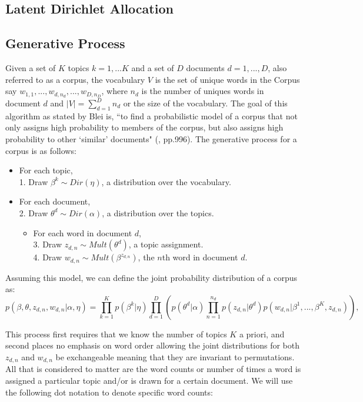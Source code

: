\documentclass[12pt]{report}
\begin{document}
\begin{flushleft}
\section{Latent Dirichlet Allocation}
\subsection{Generative Process}
Given a set of $K$ topics $k=1,...K$ and a set of $D$ documents $d=1,...,D$, also referred to as a corpus, the vocabulary $V$ is the set of unique words in the Corpus say $w_{1,1},...,w_{d,n_{d}},...,w_{D,n_{D}}$, where $n_{d}$ is the number of uniques words in document $d$ and $|V|=\sum_{d=1}^{D}{n_{d}}$ or the size of the vocabulary. The goal of this algorithm as stated by Blei is, ``to find a probabilistic model of a corpus that not only assigns high probability to members of the corpus, but also assigns high probability to other `similar' documents" (\cite{lda}, pp.996). The generative process for a corpus is as follows:
\begin{itemize}
	\item For each topic, \\
	1. Draw $\beta^{k} \sim Dir(\eta)$, a distribution over the vocabulary.
	
	\item For each document, \\
	2. Draw $\theta^{d} \sim Dir(\alpha)$, a distribution over the topics.	
	\begin{itemize}
		\item For each word in document $d$, \\
		3. Draw $z_{d,n} \sim Mult(\theta^{d})$, a topic assignment. \\
		4. Draw $w_{d,n} \sim Mult(\beta^{z_{d,n}})$, the $n$th word in document $d$.
	\end{itemize}
\end{itemize}

Assuming this model, we can define the joint probability distribution of a corpus as:
\begin{equation} \label{eq1}
p(\beta,\theta,z_{d,n},w_{d,n} | \alpha,\eta) = \prod_{k=1}^{K}{p(\beta^{k} | \eta)}  \prod_{d=1}^{D}\left( p(\theta^{d} | \alpha) \prod_{n=1}^{n_{d}}{p(z_{d,n} | \theta^{d})}p(w_{d,n} | \beta^{1},...,\beta^{K},z_{d,n}) \right),
\end{equation}

This process first requires that we know the number of topics $K$ a priori, and second places no emphasis on word order allowing the joint distributions for both $z_{d,n}$ and $w_{d,n}$ be exchangeable meaning that they are invariant to permutations. All that is considered to matter are the word counts or number of times a word is assigned a particular topic and/or is drawn for a certain document. We will use the following dot notation to denote specific word counts:


\end{flushleft}
\end{document}

